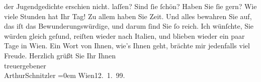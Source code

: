 \begin{ledgroupsized}[t]{13cm}
{{{                  der Jugendgedichte erschien nicht.}}}\label{K_L00880-5h} laſſen? Sind ſie ſchön? Haben Sie ſie
               gern? Wie viele Stunden hat Ihr Tag! Zu allem haben Sie Zeit. Und alles bewahren Sie
               auf, das iſt das Bewunderungswürdige, und darum {\pb}ſind Sie ſo reich.\pend
           \pstart
           Ich wünſchte, Sie würden gleich geſund, reiſten wieder nach Italien, und blieben wieder ein paar Tage in Wien. Ein Wort von Ihnen, wie’s Ihnen geht, brächte mir
               jedenfalls viel Freude.\pend
           \pstart
           Herzlich grüßt Sie Ihr Ihnen {\\[\baselineskip]}treuergebener{\\[\baselineskip]}\spacefill\mbox{ArthurSchnitzler}\pend
           \leftskip=0em{}\pstart
           Wien12. 1. 99.\pend
           
         
         \endnumbering{}\end{ledgroupsized}  \newcommand{\dateiname}{L00880}\newcommand{\titel}{Arthur Schnitzler an Georg Brandes, 12. 1. 1899}\newcommand{\editorInnen}{Martin Anton Müller und Gerd-Hermann Susen}
      